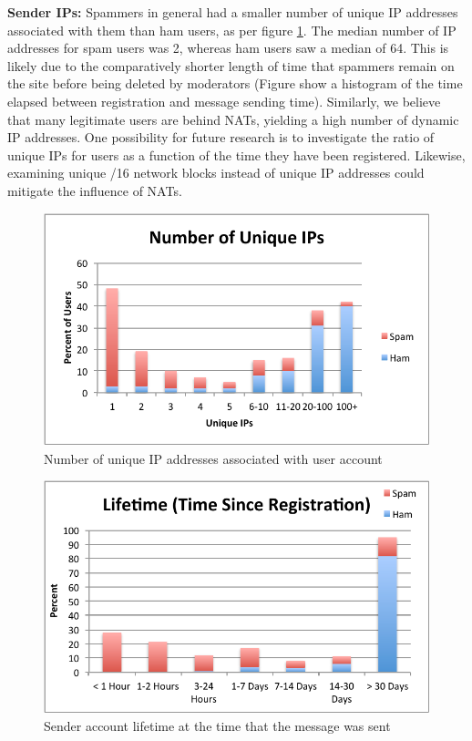 \documentclass[preprint]{acm_proc_article-sp}
\begin{document}
\textbf{Sender IPs:} Spammers in general had a smaller number of unique IP addresses associated 
with them than ham users, as per figure \ref{fig:uniqip}. The median number of IP addresses for 
spam users was 2, whereas ham users saw a median of 64. This is likely due to the comparatively 
shorter length of time that spammers remain on the site before being deleted by moderators (Figure 
\label{fig:lifetime} show a histogram of the time elapsed between registration and message sending 
time).  Similarly, we believe that many legitimate users are behind NATs, yielding a high number 
of dynamic IP addresses. One possibility for future research is to investigate the ratio of 
unique IPs for users as a function of the time they have been registered. Likewise, examining 
unique /16 network blocks instead of unique IP addresses could mitigate the influence of NATs.

\begin{figure}[h]
    \centering
    \includegraphics[width=\linewidth]{figures/unique-ips.pdf}
    \caption{Number of unique IP addresses associated with user account}
    \label{fig:uniqip}
\end{figure}

\begin{figure}[h]
    \centering
    \includegraphics[width=\linewidth]{figures/lifetime.pdf}
    \caption{Sender account lifetime at the time that the message was sent}
    \label{fig:lifetime}
\end{figure}
\end{document}
